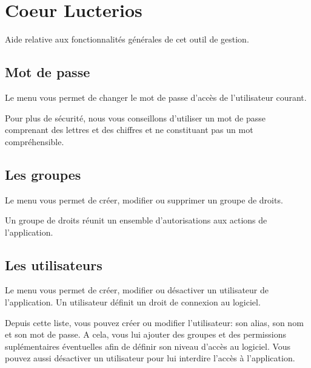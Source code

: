 \documentclass[a4paper,10pt,oneside,french]{sphinxmanual}
\begin{document}
\noindent{}


\chapter{Coeur Lucterios}
\label{\detokenize{CORE/index:coeur-lucterios}}\label{\detokenize{CORE/index::doc}}
Aide relative aux fonctionnalités générales de cet outil de gestion.


\section{Mot de passe}
\label{\detokenize{CORE/password:mot-de-passe}}\label{\detokenize{CORE/password::doc}}
Le menu  vous permet de changer le mot de passe d’accès de l’utilisateur courant.

\noindent{}

Pour plus de sécurité, nous vous conseillons d’utiliser un mot de passe comprenant des lettres et des chiffres et ne constituant pas un mot compréhensible.


\section{Les groupes}
\label{\detokenize{CORE/groups:les-groupes}}\label{\detokenize{CORE/groups::doc}}
Le menu  vous permet de créer, modifier ou supprimer un groupe de droits.

\noindent{}

Un groupe de droits réunit un ensemble d’autorisations aux actions de l’application.

\noindent{}


\section{Les utilisateurs}
\label{\detokenize{CORE/users:les-utilisateurs}}\label{\detokenize{CORE/users::doc}}
Le menu  vous
permet de créer, modifier ou désactiver un utilisateur de l’application. Un
utilisateur définit un droit de connexion au logiciel.

\noindent{}

Depuis cette liste, vous pouvez créer ou modifier l’utilisateur: son
alias, son nom et son mot de passe. A cela, vous lui ajouter des groupes et
des permissions suplémentaires éventuelles afin de définir son niveau
d’accès au logiciel. Vous pouvez aussi désactiver un utilisateur pour lui
interdire l’accès à l’application.
\end{document}
